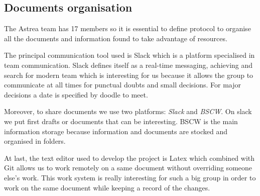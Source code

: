 \subsection{Documents organisation}


The Astrea team has 17 members so it is essential to define protocol to organise all the documents and information found to take advantage of resources. 
\newline

The principal communication tool used is Slack which is a platform specialised in team communication. Slack defines itself as a real-time messaging, achieving and search for modern team which is interesting for us because it allows the group to communicate at all times for punctual doubts and small decisions. For major decisions a date is specified by doodle to meet. 
\newline

Moreover, to share documents we use two platforms: \textit{Slack} and \textit{BSCW}. On slack we put first drafts or documents that can be interesting. BSCW is the main information storage because information and documents are stocked and organised in folders. 
\newline

At last, the text editor used to develop the project is Latex which combined with Git allows us to work remotely on a same document without overriding someone else's work. This work system is really interesting for such a big group in order to work on the same document while keeping a record of the changes.